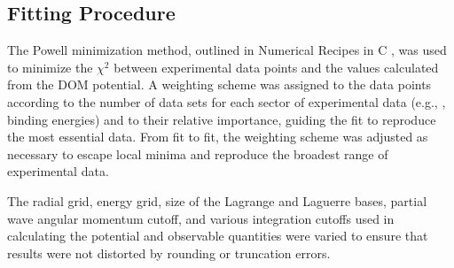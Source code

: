 \subsection{Fitting Procedure}
The Powell minimization method, outlined in Numerical Recipes in C \cite{NumericalRecipes},
was used to minimize the $\chi^{2}$ between experimental data points and the
values calculated from the DOM potential. A weighting scheme was assigned to the data points
according to the number of data sets for each sector of experimental data (e.g., \el,
binding energies) and to their relative importance, guiding the fit to reproduce
the most essential data. From fit to fit, the weighting scheme was adjusted
as necessary to escape local minima and reproduce the broadest range of experimental data.

The radial grid, energy grid, size of the Lagrange and Laguerre bases,
partial wave angular momentum cutoff,
and various integration cutoffs used in calculating the potential and
observable quantities were varied to ensure that results were not 
distorted by rounding or truncation errors.
\afterpage{\clearpage}
